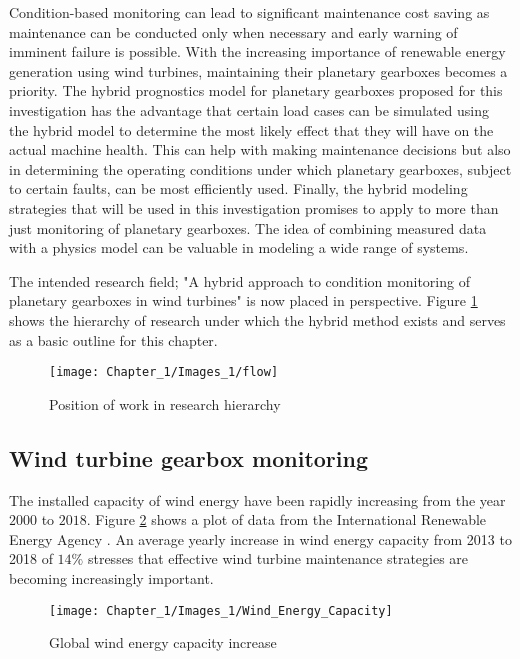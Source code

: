 Condition-based monitoring can lead to significant maintenance cost saving as maintenance can be conducted only when necessary and early warning of imminent failure is possible. With the increasing importance of renewable energy generation using wind turbines, maintaining their planetary gearboxes becomes a priority. The hybrid prognostics model for planetary gearboxes proposed for this investigation has the advantage that certain load cases can be simulated using the hybrid model to determine the most likely effect that they will have on the actual machine health. This can help with making maintenance decisions but also in determining the operating conditions under which planetary gearboxes, subject to certain faults, can be most efficiently used. Finally, the hybrid modeling strategies that will be used in this investigation promises to apply to more than just monitoring of planetary gearboxes. The idea of combining measured data with a physics model can be valuable in modeling a wide range of systems.

The intended research field; "A hybrid approach to condition monitoring of planetary gearboxes in wind turbines" is now placed in perspective. Figure \ref{F:Hierarchy} shows the hierarchy of research under which the hybrid method exists and serves as a basic outline for this chapter.

\begin{figure}[H]
	\centering
	\texttt{[image: Chapter\_1/Images\_1/flow]}
	\caption{Position of work in research hierarchy}
	\label{F:Hierarchy}
\end{figure}


\subsection{Wind turbine gearbox monitoring}
The installed capacity of wind energy have been rapidly increasing from the year $2000$ to $2018$. Figure \ref{F:WindE} shows a plot of data from the International Renewable Energy Agency \citep{IRENA2019}. An average yearly increase in wind energy capacity from 2013 to 2018 of $14\%$ stresses that effective wind turbine maintenance strategies are becoming increasingly important. %

\begin{figure}[H]
	\centering
	\texttt{[image: Chapter\_1/Images\_1/Wind\_Energy\_Capacity]}
	\caption{Global wind energy capacity increase \citep{IRENA2019}}
	\label{F:WindE}
\end{figure}



